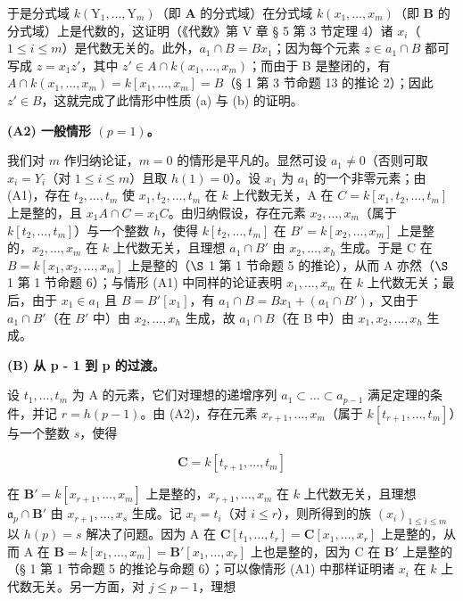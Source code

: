 于是分式域 \(k(\mathrm{Y}_1, \ldots, \mathrm{Y}_m)\)（即 \(\mathbf{A}\) 的分式域）在分式域 \(k(x_1, \ldots, x_m)\)（即 \(\mathbf{B}\) 的分式域）上是代数的，这证明（《代数》第 V 章 § 5 第 3 节定理 4）诸 \(x_i\)（\(1 \leqslant i \leqslant m\)）是代数无关的。此外，\(a_1 \cap B = Bx_1\)；因为每个元素 \(z \in a_1 \cap B\) 都可写成 \(z = x_1z'\)，其中 \(z' \in A \cap k(x_1, \ldots, x_m)\)；而由于 B 是整闭的，有 \(A \cap k(x_1, \ldots, x_m) = k[x_1, \ldots, x_m] = B\)（§ 1 第 3 节命题 13 的推论 2）；因此 \(z' \in B\)，这就完成了此情形中性质 (a) 与 (b) 的证明。

\textbf{(A2) 一般情形 \((p = 1)\)。}\par

我们对 \(m\) 作归纳论证，\(m = 0\) 的情形是平凡的。显然可设 \(a_1 \neq 0\)（否则可取 \(x_i = Y_i\)（对 \(1 \leqslant i \leqslant m\)）且取 \(h(1) = 0\)）。设 \(x_1\) 为 \(a_1\) 的一个非零元素；由 (A1)，存在 \(t_2, \ldots, t_m\) 使 \(x_1, t_2, \ldots, t_m\) 在 \(k\) 上代数无关，A 在 \(C = k[x_1, t_2, \ldots, t_m]\) 上是整的，且 \(x_1A \cap C = x_1C\)。由归纳假设，存在元素 \(x_2, \ldots, x_m\)（属于 \(k[t_2, \ldots, t_m]\)）与一个整数 \(h\)，使得 \(k[t_2, \ldots, t_m]\) 在 \(B' = k[x_2, \ldots, x_m]\) 上是整的，\(x_2, \ldots, x_m\) 在 \(k\) 上代数无关，且理想 \(a_1 \cap B'\) 由 \(x_2, \ldots, x_h\) 生成。于是 C 在 \(B = k[x_1, x_2, \ldots, x_m]\) 上是整的（\(\S\) 1 第 1 节命题 5 的推论），从而 A 亦然（\(\S\) 1 第 1 节命题 6）；与情形 (A1) 中同样的论证表明 \(x_1, \ldots, x_m\) 在 \(k\) 上代数无关；最后，由于 \(x_1 \in a_1\) 且 \(B = B'[x_1]\)，有 \(a_1 \cap B = Bx_1 + (a_1 \cap B')\)，又由于 \(a_1 \cap B'\)（在 \(B'\) 中）由 \(x_2, \ldots, x_h\) 生成，故 \(a_1 \cap B\)（在 B 中）由 \(x_1, x_2, \ldots, x_h\) 生成。

\textbf{(B) 从 p - 1 到 p 的过渡。}\par

设 \(t_1, \ldots, t_m\) 为 A 的元素，它们对理想的递增序列 \(a_1 \subset \ldots \subset a_{p-1}\) 满足定理的条件，并记 \(r = h(p - 1)\)。由 (A2)，存在元素 \(x_{r+1}, \ldots, x_m\)（属于 \(k[t_{r+1}, \ldots, t_m]\)）与一个整数 \(s\)，使得

\[
\mathbf {C} = k [ t _ {r + 1}, \dots , t _ {m} ]
\]

在 \(\mathbf{B}' = k[x_{r+1},\ldots,x_m]\) 上是整的，\(x_{r+1},\ldots,x_m\) 在 \(k\) 上代数无关，且理想 \(\mathfrak{a}_p\cap\mathbf{B}'\) 由 \(x_{r+1},\ldots,x_s\) 生成。记 \(x_i=t_i\)（对 \(i\leqslant r\)），则所得到的族 \((x_i)_{1\leqslant i\leqslant m}\) 以 \(h(p)=s\) 解决了问题。因为 A 在 \(\mathbf{C}[t_1,\ldots,t_r]=\mathbf{C}[x_1,\ldots,x_r]\) 上是整的，从而 A 在 \(\mathbf{B}=k[x_1,\ldots,x_m]=\mathbf{B}'[x_1,\ldots,x_r]\) 上也是整的，因为 C 在 \(\mathbf{B}'\) 上是整的（§ 1 第 1 节命题 5 的推论与命题 6）；可以像情形 (A1) 中那样证明诸 \(x_i\) 在 \(k\) 上代数无关。另一方面，对 \(j\leqslant p-1\)，理想

